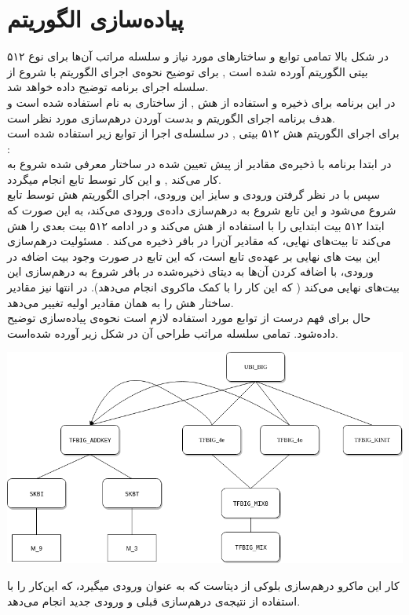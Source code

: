 \section{پیاده‌سازی الگوریتم}
در شکل بالا تمامی توابع و ساختارهای مورد نیاز  و سلسله مراتب آن‌ها برای نوع ۵۱۲ بیتی الگوریتم آورده شده است , برای توضیح نحوه‌ی اجرای الگوریتم با شروع از
 سلسله اجرای برنامه توضیح داده خواهد شد.
\\
در این برنامه برای ‌ذخیره و استفاده از هش , از ساختاری به نام \hyperref[subsec:sph-skein-big-context]{} استفاده شده است و هدف برنامه اجرای الگوریتم و بدست آوردن درهم‌سازی مورد نظر است.
\\
برای اجرای الگوریتم هش ۵۱۲ بیتی , در سلسله‌ی اجرا از توابع زیر استفاده شده است :
\\
در ابتدا برنامه با ذخیره‌ی مقادیر از پیش تعیین شده  \hyperref[subsec:IV512]{} در ساختار معرفی شده شروع به کار می‌کند , و این کار توسط تابع
\hyperref[subsec:sph-skein512-init]{}
   انجام میگردد.
  \\ سپس با در نظر گرفتن ورودی و سایز این ورودی، اجرای الگوریتم هش  توسط تابع \hyperref[subsec:sph-skein512]{}
   شروع می‌شود و این تابع شروع به درهم‌سازی داده‌ی ورودی می‌کند، به این صورت که ابتدا ۵۱۲ بیت ابتدایی را با استفاده از \hyperref[subsec:UBI-BIG]{} هش می‌کند و در ادامه ۵۱۲ بیت بعدی را هش می‌کند تا بیت‌های ‌‌نهایی،‌ که مقادیر آن‌را   در بافر ذخیره می‌کند . مسئولیت درهم‌سازی این بیت ‌های نهایی بر عهده‌ی تابع \hyperref[subsec:sph-skein512-close]{} است، که این تابع در صورت وجود بیت اضافه در ورودی، با اضافه کردن آن‌ها به دیتای‌ ذخیره‌شده در بافر شروع به درهم‌سازی این بیت‌های نهایی می‌کند ( که این کار را با کمک ماکروی  انجام می‌دهد). در انتها نیز مقادیر ساختار هش را به همان مقادیر
 اولیه تغییر می‌دهد.  \\
  حال برای فهم درست از توابع مورد استفاده لازم است نحوه‌ی پیاده‌سازی \hyperref[subsec:UBI-BIG]{} توضیح داده‌شود. تمامی سلسله مراتب طراحی آن در شکل زیر آورده شده‌است.


\begin{center}
  		\includegraphics[width=16cm]{images/GoldenModelDocumentation/UBI.png}	
  \end{center}

  

کار این ماکرو درهم‌سازی بلوکی از دیتاست که به عنوان ورودی میگیرد،‌ که این‌کار را با استفاده از نتیجه‌ی درهم‌سازی قبلی و ورودی جدید انجام می‌دهد.

